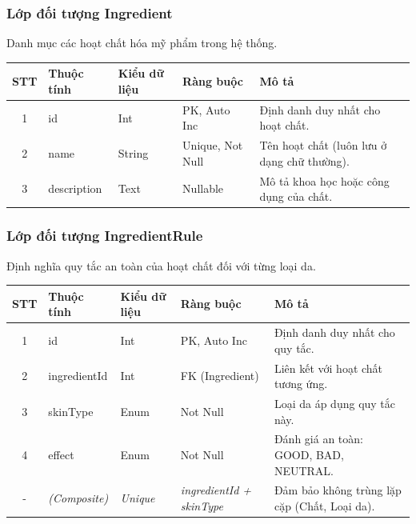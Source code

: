 \documentclass[12pt,a4paper]{article}
\begin{document}
\subsubsection{Lớp đối tượng Ingredient}
Danh mục các hoạt chất hóa mỹ phẩm trong hệ thống.

\begin{center}
\renewcommand{\arraystretch}{1.4}
\begin{tabularx}{\textwidth}{|c|l|l|l|X|}
\hline
\rowcolor{blue!15}
\textbf{STT} & \textbf{Thuộc tính} & \textbf{Kiểu dữ liệu} & \textbf{Ràng buộc} & \textbf{Mô tả} \\ \hline
1 & id & Int & PK, Auto Inc & Định danh duy nhất cho hoạt chất. \\ \hline
2 & name & String & Unique, Not Null & Tên hoạt chất (luôn lưu ở dạng chữ thường). \\ \hline
3 & description & Text & Nullable & Mô tả khoa học hoặc công dụng của chất. \\ \hline
\end{tabularx}
\end{center}

\subsubsection{Lớp đối tượng IngredientRule}
Định nghĩa quy tắc an toàn của hoạt chất đối với từng loại da.

\begin{center}
\renewcommand{\arraystretch}{1.4}
\begin{tabularx}{\textwidth}{|c|l|l|l|X|}
\hline
\rowcolor{blue!15}
\textbf{STT} & \textbf{Thuộc tính} & \textbf{Kiểu dữ liệu} & \textbf{Ràng buộc} & \textbf{Mô tả} \\ \hline
1 & id & Int & PK, Auto Inc & Định danh duy nhất cho quy tắc. \\ \hline
2 & ingredientId & Int & FK (Ingredient) & Liên kết với hoạt chất tương ứng. \\ \hline
3 & skinType & Enum & Not Null & Loại da áp dụng quy tắc này. \\ \hline
4 & effect & Enum & Not Null & Đánh giá an toàn: GOOD, BAD, NEUTRAL. \\ \hline
- & \textit{(Composite)} & \textit{Unique} & \textit{ingredientId + skinType} & Đảm bảo không trùng lặp cặp (Chất, Loại da). \\ \hline
\end{tabularx}
\end{center}
\end{document}
